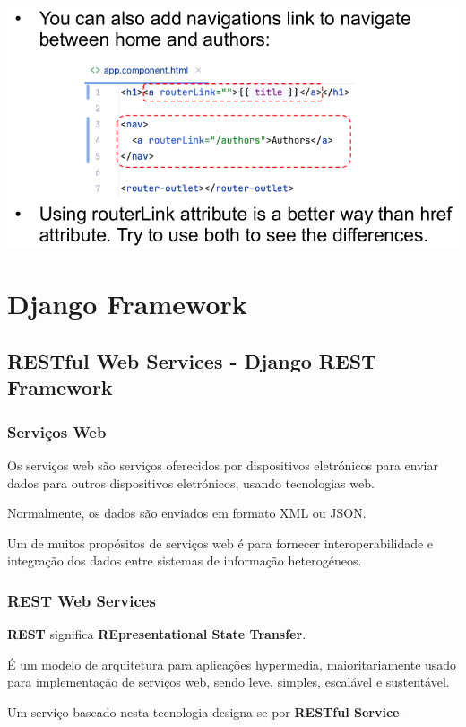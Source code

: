 \documentclass{article}
\begin{document}
\begin{center}
  \includegraphics[scale=0.3]{10}
\end{center}

\section{Django Framework}

\subsection{RESTful Web Services - Django REST Framework}

\subsubsection{Serviços Web}

Os serviços web são serviços oferecidos por dispositivos eletrónicos
para enviar dados para outros dispositivos eletrónicos, usando tecnologias web.

Normalmente, os dados são enviados em formato XML ou JSON.

Um de muitos propósitos de serviços web é para fornecer interoperabilidade e
integração dos dados entre sistemas de informação heterogéneos.

\subsubsection{REST Web Services}

\textbf{REST} significa \textbf{REpresentational State Transfer}.

É um modelo de arquitetura para aplicações hypermedia, maioritariamente usado para
implementação de serviços web, sendo leve, simples, escalável e sustentável.

Um serviço baseado nesta tecnologia designa-se por \textbf{RESTful Service}.
\end{document}
